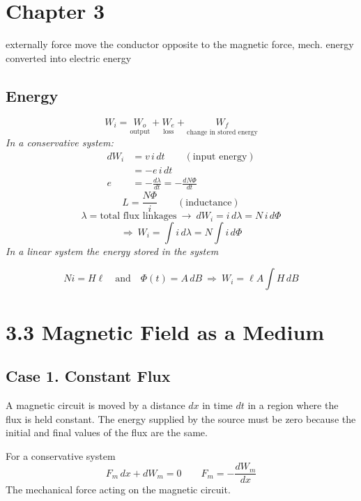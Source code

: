 \documentclass[11pt,a4paper]{article}
\begin{document}

\section{Chapter 3}
externally force move the conductor opposite to the magnetic force, mech. energy converted into electric energy

\subsection{Energy}
\[ W_i=\underset{\text{output}}{W_o}+\underset{\text{loss}}{W_e}+\underset{\text{change in stored energy}}{W_f} \]
\noindent\textit{In a conservative system:}
\begin{align*}
dW_i&=v\,i\,dt\qquad(\text{input energy})\\
&=-e\,i\,dt\\
e&=-\frac{d\lambda}{dt}=-\frac{dN\Phi}{dt}
\end{align*}
\[ L=\frac{N\Phi}{i}\qquad(\text{inductance}) \]
\[ \lambda=\text{total flux linkages}\ \rightarrow\ dW_i=i\,d\lambda=N\,i\,d\Phi \]
\[ \Rightarrow\ W_i=\int i\,d\lambda=N\int i\,d\Phi \]
\noindent\textit{In a linear system the energy stored in the system}
\begin{center}\end{center}
\[ Ni=H\ell\quad\text{and}\quad\Phi(t)=A\,dB\ \Rightarrow\ W_i=\ell A\int H\,dB \]

\section{3.3 Magnetic Field as a Medium}
\subsection{Case 1. Constant Flux}
A magnetic circuit is moved by a distance $dx$ in time $dt$ in a region where the flux is held constant. The energy supplied by the source must be zero because the initial and final values of the flux are the same.

\noindent For a conservative system
\[ F_m\,dx+dW_m=0\qquad F_m=-\frac{dW_m}{dx} \]
\noindent The mechanical force acting on the magnetic circuit.
\end{document}
